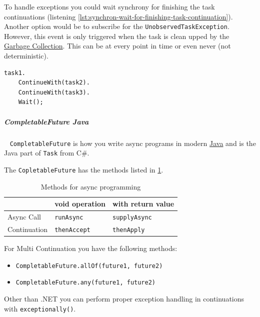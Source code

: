 \documentclass[11pt,twoside,landscape]{article}
\begin{document}
\begin{multicols}{3}
{{To handle exceptions you could wait synchrony for finishing the task continuations (listening \ref{lst:synchron-wait-for-finishing-task-continuation}).
Another option would be to subscribe for the \texttt{UnobservedTaskException}.
However, this event is only triggered when the task is clean upped by the \href{../../../roam/20211008083744-garbage_collection.org}{Garbage Collection}.
This can be at every point in time or even never (not deterministic).

\begin{lstlisting}
task1.
    ContinueWith(task2).
    ContinueWith(task3).
    Wait();
\end{lstlisting}
\subparagraph{CompletableFuture Java} \
\label{sec:org084bca7}
\texttt{CompletableFuture} is how you write async programs in modern \href{../../../roam/20201116150053-java.org}{Java} and is the Java part of \texttt{Task} from C\#.

The \texttt{CopletableFuture} has the methods listed in \ref{tbl:methods-for-async-programming}. 

\begin{table}[htbp]
\caption{\label{tbl:methods-for-async-programming}Methods for async programming}
\centering
\begin{tabular}{lll}
 & void operation & with return value\\
\hline
Async Call & \texttt{runAsync} & \texttt{supplyAsync}\\
Continuation & \texttt{thenAccept} & \texttt{thenApply}\\
\end{tabular}
\end{table}

For Multi Continuation you have the following methods:
\begin{itemize}
\item \texttt{CompletableFuture.allOf(future1, future2)}
\item \texttt{CompletableFuture.any(future1, future2)}
\end{itemize}


Other than .NET you can perform proper exception handling in continuations with \texttt{exceptionally()}.

}}
\end{multicols}
\end{document}
